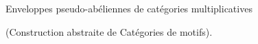 
Enveloppes pseudo-abéliennes
de catégories multiplicatives

(Construction abstraite de
Catégories de motifs).
